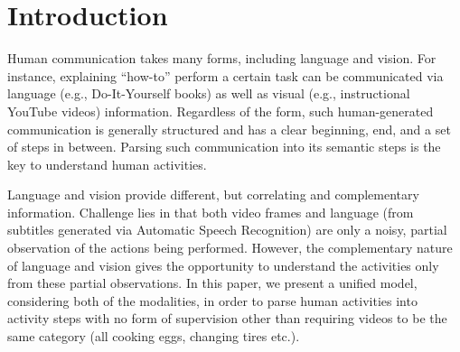 
\section{Introduction}
Human communication takes many forms, including language and vision. For instance, explaining ``how-to'' perform a certain task can be communicated via language (e.g., Do-It-Yourself books) as well as visual (e.g., instructional YouTube videos) information. Regardless of the form, such human-generated communication is generally structured and has a clear beginning, end, and a set of steps in between. Parsing such communication into its semantic steps is the key to understand human activities.




%
Language and vision provide different, but correlating and complementary information. Challenge lies in that both video frames and language (from subtitles generated via Automatic Speech Recognition) are only a noisy, partial observation of the actions being performed. However, the complementary nature of language and vision gives the opportunity to understand the activities only from these partial observations. In this paper, we present a unified model, considering both of the modalities, in order to parse human activities into activity steps with no form of supervision other than requiring videos to be the same category (\eg all cooking eggs, changing tires etc.).

%





